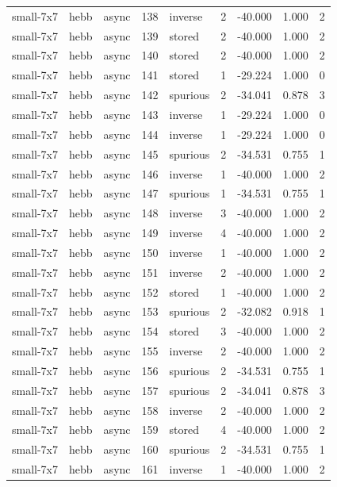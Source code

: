 \begin{tabular}{lllrlrrrr}
small-7x7 & hebb & async & 138 & inverse & 2 & -40.000 & 1.000 & 2 \\
small-7x7 & hebb & async & 139 & stored & 2 & -40.000 & 1.000 & 2 \\
small-7x7 & hebb & async & 140 & stored & 2 & -40.000 & 1.000 & 2 \\
small-7x7 & hebb & async & 141 & stored & 1 & -29.224 & 1.000 & 0 \\
small-7x7 & hebb & async & 142 & spurious & 2 & -34.041 & 0.878 & 3 \\
small-7x7 & hebb & async & 143 & inverse & 1 & -29.224 & 1.000 & 0 \\
small-7x7 & hebb & async & 144 & inverse & 1 & -29.224 & 1.000 & 0 \\
small-7x7 & hebb & async & 145 & spurious & 2 & -34.531 & 0.755 & 1 \\
small-7x7 & hebb & async & 146 & inverse & 1 & -40.000 & 1.000 & 2 \\
small-7x7 & hebb & async & 147 & spurious & 1 & -34.531 & 0.755 & 1 \\
small-7x7 & hebb & async & 148 & inverse & 3 & -40.000 & 1.000 & 2 \\
small-7x7 & hebb & async & 149 & inverse & 4 & -40.000 & 1.000 & 2 \\
small-7x7 & hebb & async & 150 & inverse & 1 & -40.000 & 1.000 & 2 \\
small-7x7 & hebb & async & 151 & inverse & 2 & -40.000 & 1.000 & 2 \\
small-7x7 & hebb & async & 152 & stored & 1 & -40.000 & 1.000 & 2 \\
small-7x7 & hebb & async & 153 & spurious & 2 & -32.082 & 0.918 & 1 \\
small-7x7 & hebb & async & 154 & stored & 3 & -40.000 & 1.000 & 2 \\
small-7x7 & hebb & async & 155 & inverse & 2 & -40.000 & 1.000 & 2 \\
small-7x7 & hebb & async & 156 & spurious & 2 & -34.531 & 0.755 & 1 \\
small-7x7 & hebb & async & 157 & spurious & 2 & -34.041 & 0.878 & 3 \\
small-7x7 & hebb & async & 158 & inverse & 2 & -40.000 & 1.000 & 2 \\
small-7x7 & hebb & async & 159 & stored & 4 & -40.000 & 1.000 & 2 \\
small-7x7 & hebb & async & 160 & spurious & 2 & -34.531 & 0.755 & 1 \\
small-7x7 & hebb & async & 161 & inverse & 1 & -40.000 & 1.000 & 2 \\

\end{tabular}

